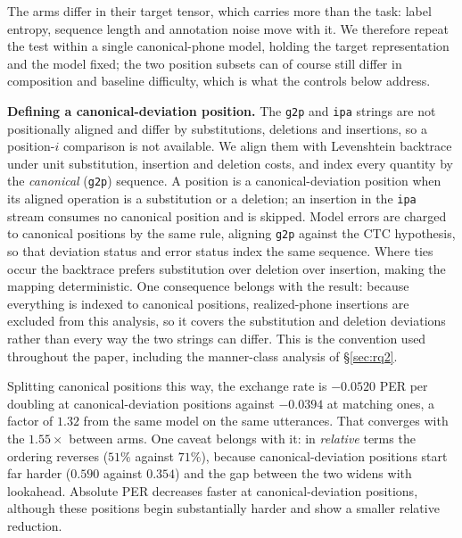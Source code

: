 \documentclass[journal]{IEEEtran}
\begin{document}
The arms differ in their target tensor, which carries more than the task: label
entropy, sequence length and annotation noise move with it. We therefore repeat
the test within a single canonical-phone model, holding the target
representation and the model fixed; the two position subsets can of course
still differ in composition and baseline difficulty, which is what the controls
below address.

\textbf{Defining a canonical-deviation position.} The \texttt{g2p} and
\texttt{ipa} strings are not positionally aligned and differ by substitutions,
deletions and insertions, so a position-$i$ comparison is not available. We
align them with Levenshtein backtrace under unit substitution, insertion and
deletion costs, and index every quantity by the \emph{canonical}
(\texttt{g2p}) sequence. A position is a canonical-deviation position when its
aligned operation is a substitution or a deletion; an insertion in the
\texttt{ipa} stream consumes no canonical position and is skipped. Model errors
are charged to canonical positions by the same rule, aligning \texttt{g2p}
against the CTC hypothesis, so that deviation status and error status index the
same sequence. Where ties occur the backtrace prefers substitution over
deletion over insertion, making the mapping deterministic. One consequence
belongs with the result: because everything is indexed to canonical positions,
realized-phone insertions are excluded from this analysis, so it covers the
substitution and deletion deviations rather than every way the two strings can
differ. This is the
convention used throughout the paper, including the manner-class analysis of
\S\ref{sec:rq2}.

Splitting canonical positions this way, the exchange rate is $-0.0520$ PER
per doubling at canonical-deviation positions against $-0.0394$ at matching ones,
a factor of $\mathbf{1.32}$ from the same model on the same utterances. That
converges with the $1.55\times$ between arms. One caveat belongs with it: in
\emph{relative} terms the ordering reverses ($51\%$ against $71\%$), because
canonical-deviation positions start far harder ($0.590$ against $0.354$) and the
gap between the two widens with lookahead. Absolute PER decreases faster at canonical-deviation positions, although these
positions begin substantially harder and show a smaller relative reduction.
\end{document}

